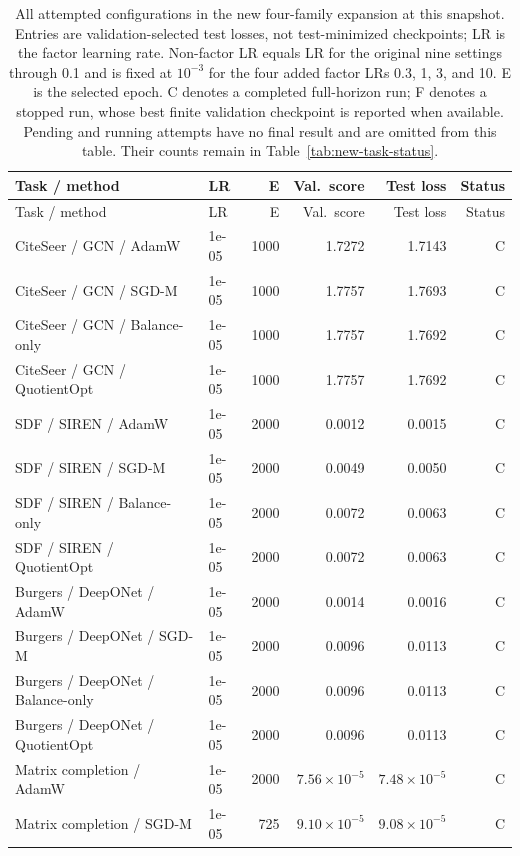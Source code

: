 \begingroup\small\setlength{\tabcolsep}{3pt}
\begin{longtable}{p{.34\linewidth}p{.09\linewidth}rrrr}
\caption{All attempted configurations in the new four-family expansion at this snapshot. Entries are validation-selected test losses, not test-minimized checkpoints; LR is the factor learning rate. Non-factor LR equals LR for the original nine settings through 0.1 and is fixed at $10^{-3}$ for the four added factor LRs 0.3, 1, 3, and 10. E is the selected epoch. C denotes a completed full-horizon run; F denotes a stopped run, whose best finite validation checkpoint is reported when available. Pending and running attempts have no final result and are omitted from this table. Their counts remain in Table~\ref{tab:new-task-status}.}\label{tab:new-task-all}\\
\toprule Task / method & LR & E & Val.\ score & Test loss & Status\\\midrule\endfirsthead
\toprule Task / method & LR & E & Val.\ score & Test loss & Status\\\midrule\endhead
CiteSeer / GCN / AdamW & 1e-05 & 1000 & 1.7272 & 1.7143 & C\\
CiteSeer / GCN / SGD-M & 1e-05 & 1000 & 1.7757 & 1.7693 & C\\
CiteSeer / GCN / Balance-only & 1e-05 & 1000 & 1.7757 & 1.7692 & C\\
\rowcolor{oursbg}CiteSeer / GCN / QuotientOpt & 1e-05 & 1000 & 1.7757 & 1.7692 & C\\
SDF / SIREN / AdamW & 1e-05 & 2000 & 0.0012 & 0.0015 & C\\
SDF / SIREN / SGD-M & 1e-05 & 2000 & 0.0049 & 0.0050 & C\\
SDF / SIREN / Balance-only & 1e-05 & 2000 & 0.0072 & 0.0063 & C\\
\rowcolor{oursbg}SDF / SIREN / QuotientOpt & 1e-05 & 2000 & 0.0072 & 0.0063 & C\\
Burgers / DeepONet / AdamW & 1e-05 & 2000 & 0.0014 & 0.0016 & C\\
Burgers / DeepONet / SGD-M & 1e-05 & 2000 & 0.0096 & 0.0113 & C\\
Burgers / DeepONet / Balance-only & 1e-05 & 2000 & 0.0096 & 0.0113 & C\\
\rowcolor{oursbg}Burgers / DeepONet / QuotientOpt & 1e-05 & 2000 & 0.0096 & 0.0113 & C\\
Matrix completion / AdamW & 1e-05 & 2000 & $7.56\!\times\!10^{-5}$ & $7.48\!\times\!10^{-5}$ & C\\
Matrix completion / SGD-M & 1e-05 & 725 & $9.10\!\times\!10^{-5}$ & $9.08\!\times\!10^{-5}$ & C\\

\end{longtable}
